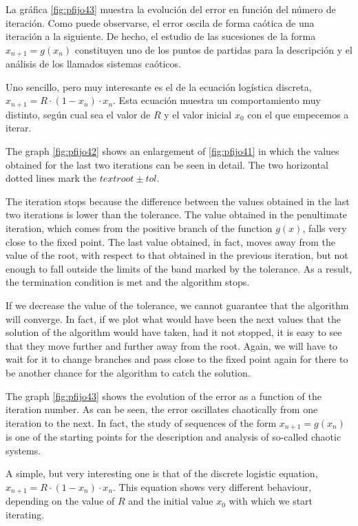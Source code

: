 \begin{paracol}{2}
  La gráfica \ref{fig:pfijo43} muestra la evolución del error en función del número de iteración. Como puede observarse, el error oscila de forma caótica de una iteración a la siguiente. De hecho, el estudio de las sucesiones de la forma $x_{n+1}=g(x_n)$ constituyen uno de los puntos de partidas para la descripción y el análisis de los llamados sistemas caóticos. 

Uno sencillo, pero muy interesante es el de la ecuación logística discreta, $x_{n+1}=R\cdot (1-x_n)\cdot x_n$. Esta ecuación muestra un comportamiento muy distinto, según cual sea el valor de $R$ y el valor inicial $x_0$ con el que empecemos a iterar.
  
\switchcolumn

The graph \ref{fig:pfijo42} shows an enlargement of \ref{fig:pfijo41} in which the values obtained for the last two iterations can be seen in detail. The two horizontal dotted lines mark the $text{root}\pm tol$. 

 The iteration stops because the difference between the values obtained in the last two iterations is lower than the tolerance. The value obtained in the penultimate iteration, which comes from the positive branch of the function $g(x)$, falls very close to the fixed point. The last value obtained, in fact, moves away from the value of the root, with respect to that obtained in the previous iteration, but not enough to fall outside the limits of the band marked by the tolerance. As a result, the termination condition is met and the algorithm stops. 

 If we decrease the value of the tolerance, we cannot guarantee that the algorithm will converge. In fact, if we plot what would have been the next values that the solution of the algorithm would have taken, had it not stopped, it is easy to see that they move further and further away from the root. Again, we will have to wait for it to change branches and pass close to the fixed point again for there to be another chance for the algorithm to catch the solution.
 
The graph \ref{fig:pfijo43} shows the evolution of the error as a function of the iteration number. As can be seen, the error oscillates chaotically from one iteration to the next. In fact, the study of sequences of the form $x_{n+1}=g(x_n)$ is one of the starting points for the description and analysis of so-called chaotic systems. 

A simple, but very interesting one is that of the discrete logistic equation, $x_{n+1}=R\cdot (1-x_n)\cdot x_n$. This equation shows very different behaviour, depending on the value of $R$ and the initial value $x_0$ with which we start iterating.
\end{paracol} 

